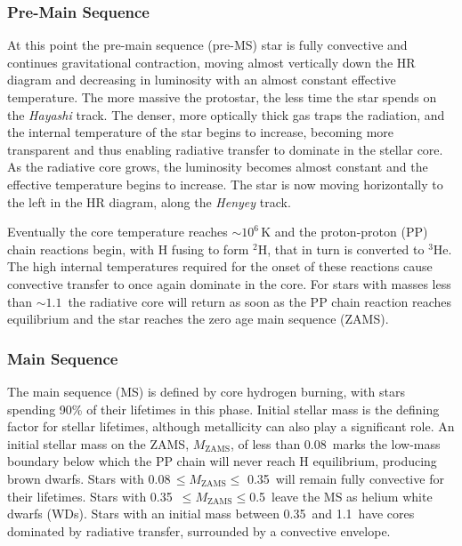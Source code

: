 \subsubsection{Pre-Main Sequence}

At this point the pre-main sequence (pre-MS) star is fully convective and continues gravitational contraction, moving almost vertically down the HR diagram and decreasing in luminosity with an almost constant effective temperature. The more massive the protostar, the less time the star spends on the {\em Hayashi} track. The denser, more optically thick gas traps the radiation, and the internal temperature of the star begins to increase, becoming more transparent and thus enabling radiative transfer to dominate in the stellar core. As the radiative core grows, the luminosity becomes almost constant and the effective temperature begins to increase. The star is now moving horizontally to the left in the HR diagram, along the {\em Henyey} track.

Eventually the core temperature reaches $\sim10^6$\,K and the proton-proton (PP) chain reactions begin, with H fusing to form ${}^{2}$H, that in turn is converted to ${}^{3}$He. The high internal temperatures required for the onset of these reactions cause convective transfer to once again dominate in the core. For stars with masses less than $\sim1.1\,$\Msol{} the radiative core will return as soon as the PP chain reaction reaches equilibrium and the star reaches the zero age main sequence (ZAMS).

\subsubsection{Main Sequence}

The main sequence (MS) is defined by core hydrogen burning, with stars spending \texttildelow{}90\% of their lifetimes in this phase. Initial stellar mass is the defining factor for stellar lifetimes, although metallicity can also play a significant role. An initial stellar mass on the ZAMS, $M_{\mathrm{ZAMS}}$, of less than 0.08\,\Msol{} marks the low-mass boundary below which the PP chain will never reach H equilibrium, producing brown dwarfs. Stars with 0.08\,\Msol$ \leq M_{\mathrm{ZAMS}} \leq $ 0.35\,\Msol{} will remain fully convective for their lifetimes. Stars with 0.35\,\Msol{} $\leq M_{\mathrm{ZAMS}} \leq $0.5\,\Msol{} leave the MS as helium white dwarfs (WDs). Stars with an initial mass between 0.35\,\Msol{} and 1.1\,\Msol{} have cores dominated by radiative transfer, surrounded by a convective envelope.

